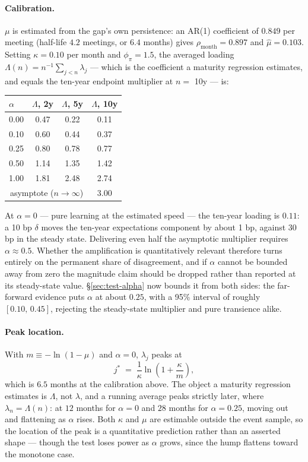 \documentclass[11pt]{article}
\begin{document}
\paragraph{Calibration.} $\mu$ is estimated from the gap's own persistence: an AR(1)
coefficient of $0.849$ per meeting (half-life $4.2$ meetings, or $6.4$ months) gives
$\rho_{\text{month}}=0.897$ and $\hat\mu=0.103$. Setting $\kappa=0.10$ per month and
$\phi_\pi=1.5$, the averaged loading $\Lambda(n)=n^{-1}\sum_{j<n}\lambda_j$ --- which is the
coefficient a maturity regression estimates, and equals the ten-year endpoint multiplier at
$n=$ 10y --- is:
\begin{center}\small
\begin{tabular}{lccc}
\toprule
$\alpha$ & $\Lambda$, 2y & $\Lambda$, 5y & $\Lambda$, 10y\\ \midrule
0.00 & 0.47 & 0.22 & 0.11\\
0.10 & 0.60 & 0.44 & 0.37\\
0.25 & 0.80 & 0.78 & 0.77\\
0.50 & 1.14 & 1.35 & 1.42\\
1.00 & 1.81 & 2.48 & 2.74\\
\multicolumn{3}{r}{asymptote ($n\to\infty$)} & 3.00\\
\bottomrule\end{tabular}
\end{center}
\noindent At $\alpha=0$ --- pure learning at the estimated speed --- the ten-year loading is
$0.11$: a 10 bp $\delta$ moves the ten-year expectations component by about 1 bp, against 30 bp
in the steady state. Delivering even half the asymptotic multiplier requires
$\alpha\approx0.5$. Whether the amplification is quantitatively relevant therefore turns
entirely on the permanent share of disagreement, and if $\alpha$ cannot be bounded away from
zero the magnitude claim should be dropped rather than reported at its steady-state value.
\S\ref{sec:test-alpha} now bounds it from both sides: the far-forward evidence puts
$\alpha$ at about $0.25$, with a 95\% interval of roughly $[0.10,\,0.45]$, rejecting the
steady-state multiplier and pure transience alike.
\paragraph{Peak location.} With $m\equiv-\ln(1-\mu)$ and $\alpha=0$, $\lambda_j$ peaks at
\begin{equation}
j^{*} \;=\; \frac{1}{\kappa}\ln\!\left(1+\frac{\kappa}{m}\right),
\label{eq:peak}
\end{equation}
which is $6.5$ months at the calibration above. The object a maturity regression estimates is
$\Lambda$, not $\lambda$, and a running average peaks strictly later, where
$\lambda_n=\Lambda(n)$: at $12$ months for $\alpha=0$ and $28$ months for $\alpha=0.25$, moving
out and flattening as $\alpha$ rises. Both $\kappa$ and $\mu$ are estimable outside the event
sample, so the location of the peak is a quantitative prediction rather than an asserted
shape --- though the test loses power as $\alpha$ grows, since the hump flattens toward the
monotone case.
\end{document}
